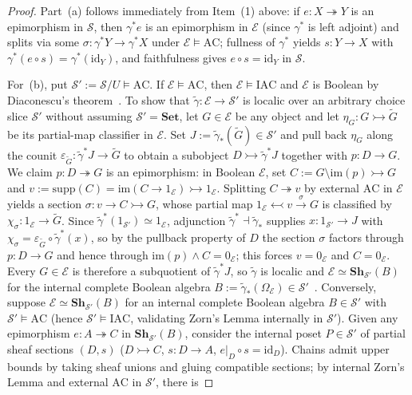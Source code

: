 \documentclass[10pt,twoside,openright]{book}
\theoremstyle{crmplain}
\theoremstyle{crmdef}
\theoremstyle{crmremark}
\begin{document}
\begin{proof}
Part~(a) follows immediately from Item~(1) above: if $e : X \twoheadrightarrow Y$ is an epimorphism in $\mathcal{S}$, then $\gamma^* e$ is an epimorphism in $\mathcal{E}$ (since $\gamma^*$ is left adjoint) and splits via some $\sigma : \gamma^* Y \to \gamma^* X$ under $\mathcal{E} \models \mathrm{AC}$; fullness of $\gamma^*$ yields $s : Y \to X$ with $\gamma^*(e \circ s) = \gamma^*(\mathrm{id}_Y)$, and faithfulness gives $e \circ s = \mathrm{id}_Y$ in $\mathcal{S}$.

For~(b), put $\mathcal{S}' := \mathcal{S}/U \models \mathrm{AC}$. If $\mathcal{E} \models \mathrm{AC}$, then $\mathcal{E} \models \mathrm{IAC}$ and $\mathcal{E}$ is Boolean by Diaconescu's theorem~\cite{Diaconescu75}. To show that $\tilde{\gamma} : \mathcal{E} \to \mathcal{S}'$ is localic over an arbitrary choice slice $\mathcal{S}'$ without assuming $\mathcal{S}' = \mathbf{Set}$, let $G \in \mathcal{E}$ be any object and let $\eta_G : G \rightarrowtail \widetilde{G}$ be its partial-map classifier in $\mathcal{E}$. Set $J := \tilde{\gamma}_*(\widetilde{G}) \in \mathcal{S}'$ and pull back $\eta_G$ along the counit $\varepsilon_{\widetilde{G}} : \tilde{\gamma}^* J \to \widetilde{G}$ to obtain a subobject $D \rightarrowtail \tilde{\gamma}^* J$ together with $p : D \to G$. We claim $p : D \twoheadrightarrow G$ is an epimorphism: in Boolean $\mathcal{E}$, set $C := G \setminus \mathrm{im}(p) \rightarrowtail G$ and $v := \mathrm{supp}(C) = \mathrm{im}(C \to 1_{\mathcal{E}}) \rightarrowtail 1_{\mathcal{E}}$. Splitting $C \twoheadrightarrow v$ by external $\mathrm{AC}$ in $\mathcal{E}$ yields a section $\sigma : v \to C \rightarrowtail G$, whose partial map $1_{\mathcal{E}} \leftarrowtail v \xrightarrow{\sigma} G$ is classified by $\chi_\sigma : 1_{\mathcal{E}} \to \widetilde{G}$. Since $\tilde{\gamma}^*(1_{\mathcal{S}'}) \simeq 1_{\mathcal{E}}$, adjunction $\tilde{\gamma}^* \dashv \tilde{\gamma}_*$ supplies $x : 1_{\mathcal{S}'} \to J$ with $\chi_\sigma = \varepsilon_{\widetilde{G}} \circ \tilde{\gamma}^*(x)$, so by the pullback property of $D$ the section $\sigma$ factors through $p : D \to G$ and hence through $\mathrm{im}(p) \wedge C = 0_{\mathcal{E}}$; this forces $v = 0_{\mathcal{E}}$ and $C = 0_{\mathcal{E}}$. Every $G \in \mathcal{E}$ is therefore a subquotient of $\tilde{\gamma}^* J$, so $\tilde{\gamma}$ is localic and $\mathcal{E} \simeq \mathbf{Sh}_{\mathcal{S}'}(B)$ for the internal complete Boolean algebra $B := \tilde{\gamma}_*(\Omega_{\mathcal{E}}) \in \mathcal{S}'$~\cite[\S A4.6, \S D4.5]{Johnstone02}. Conversely, suppose $\mathcal{E} \simeq \mathbf{Sh}_{\mathcal{S}'}(B)$ for an internal complete Boolean algebra $B \in \mathcal{S}'$ with $\mathcal{S}' \models \mathrm{AC}$ (hence $\mathcal{S}' \models \mathrm{IAC}$, validating Zorn's Lemma internally in $\mathcal{S}'$). Given any epimorphism $e : A \twoheadrightarrow C$ in $\mathbf{Sh}_{\mathcal{S}'}(B)$, consider the internal poset $P \in \mathcal{S}'$ of partial sheaf sections $(D, s)$ ($D \rightarrowtail C$, $s : D \to A$, $e|_D \circ s = \mathrm{id}_D$). Chains admit upper bounds by taking sheaf unions and gluing compatible sections; by internal Zorn's Lemma and external $\mathrm{AC}$ in $\mathcal{S}'$, there is 
\end{proof}
\end{document}
